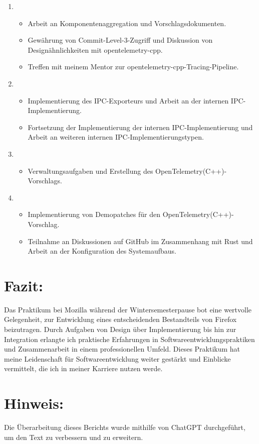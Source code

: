 \documentclass{article}
\begin{document}
\begin{enumerate}[label=\textbf{Woche \arabic*:}]
    \item {}
          \begin{itemize}
              \item Arbeit an Komponentenaggregation und Vorschlagsdokumenten.
              \item Gewährung von Commit-Level-3-Zugriff und Diskussion von Designähnlichkeiten mit
                    opentelemetry-cpp.
              \item Treffen mit meinem Mentor zur opentelemetry-cpp-Tracing-Pipeline.
          \end{itemize}

    \item {}
          \begin{itemize}
              \item Implementierung des IPC-Exporteurs und Arbeit an der internen
                    IPC-Implementierung.
              \item Fortsetzung der Implementierung der internen IPC-Implementierung und Arbeit an
                    weiteren internen IPC-Implementierungstypen.
          \end{itemize}

    \item {}
          \begin{itemize}
              \item Verwaltungsaufgaben und Erstellung des OpenTelemetry(C++)-Vorschlags.
          \end{itemize}

    \item {}
          \begin{itemize}
              \item Implementierung von Demopatches für den OpenTelemetry(C++)-Vorschlag.
              \item Teilnahme an Diskussionen auf GitHub im Zusammenhang mit Rust und Arbeit an der
                    Konfiguration des Systemaufbaus.
          \end{itemize}

\end{enumerate}

\section*{Fazit:}

Das Praktikum bei Mozilla während der Wintersemesterpause bot eine wertvolle
Gelegenheit, zur Entwicklung eines entscheidenden Bestandteils von Firefox
beizutragen. Durch Aufgaben von Design über Implementierung bis hin zur
Integration erlangte ich praktische Erfahrungen in
Softwareentwicklungspraktiken und Zusammenarbeit in einem professionellen
Umfeld. Dieses Praktikum hat meine Leidenschaft für Softwareentwicklung weiter
gestärkt und Einblicke vermittelt, die ich in meiner Karriere nutzen werde.

\section*{Hinweis:}

Die Überarbeitung dieses Berichts wurde mithilfe von ChatGPT durchgeführt, um
den Text zu verbessern und zu erweitern.
\end{document}
